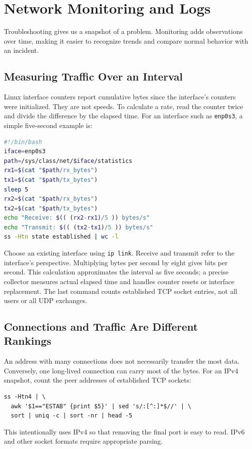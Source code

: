 \documentclass[journal]{IEEEtran}
\begin{document}
\section{Network Monitoring and Logs}
Troubleshooting gives us a snapshot of a problem. Monitoring adds observations over time, making it easier to recognize trends and compare normal behavior with an incident.

\subsection{Measuring Traffic Over an Interval}
Linux interface counters report cumulative bytes since the interface's counters were initialized. They are not speeds. To calculate a rate, read the counter twice and divide the difference by the elapsed time. For an interface such as \texttt{enp0s3}, a simple five-second example is:
\begin{lstlisting}[language=bash]
#!/bin/bash
iface=enp0s3
path=/sys/class/net/$iface/statistics
rx1=$(cat "$path/rx_bytes")
tx1=$(cat "$path/tx_bytes")
sleep 5
rx2=$(cat "$path/rx_bytes")
tx2=$(cat "$path/tx_bytes")
echo "Receive: $(( (rx2-rx1)/5 )) bytes/s"
echo "Transmit: $(( (tx2-tx1)/5 )) bytes/s"
ss -Htn state established | wc -l
\end{lstlisting}
Choose an existing interface using \texttt{ip link}. Receive and transmit refer to the interface's perspective. Multiplying bytes per second by eight gives bits per second. This calculation approximates the interval as five seconds; a precise collector measures actual elapsed time and handles counter resets or interface replacement. The last command counts established TCP socket entries, not all users or all UDP exchanges.

\subsection{Connections and Traffic Are Different Rankings}
An address with many connections does not necessarily transfer the most data. Conversely, one long-lived connection can carry most of the bytes. For an IPv4 snapshot, count the peer addresses of established TCP sockets:
\begin{lstlisting}
ss -Htn4 | \
  awk '$1=="ESTAB" {print $5}' | sed 's/:[^:]*$//' | \
  sort | uniq -c | sort -nr | head -5
\end{lstlisting}
This intentionally uses IPv4 so that removing the final port is easy to read. IPv6 and other socket formats require appropriate parsing.
\end{document}
